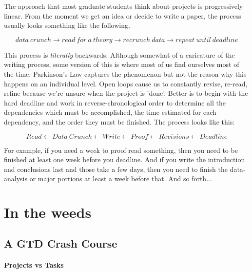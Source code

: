 \documentclass{tufte-handout}
\begin{document}
The approach that most graduate students think about projects is
progressively linear. From the moment we get an idea or decide to
write a paper, the process usually looks something like the following.

\[ data~ crunch \rightarrow read~ for~ a~ theory \rightarrow recrunch~
  data \rightarrow repeat~ until~ deadline \]

This process is \textit{literally} backwards. Although somewhat of a
caricature of the writing process, some version of this is where most
of us find ourselves most of the time. Parkinson's Law captures the
phenomenon but not the reason why this happens on an individual
level. Open loops cause us to constantly revise, re-read, refine
because we're unsure when the project is 'done'. Better is to begin
with the hard deadline and work in reverse-chronological order to
determine all the dependencies which must be accomplished, the time
estimated for each dependency, and the order they must be
finished. The process looks like this:

\[Read \leftarrow Data~ Crunch \leftarrow Write \leftarrow Proof  \leftarrow Revisions \leftarrow Deadline  \]

\noindent For example, if you need a week to proof read something, then
you need to be finished at least one week before you deadline. And if
you write the introduction and conclusions last and those take a few
days, then you need to finish the data-analysis or major portions at
least a week before that. And so forth...

\section{In the weeds}
\label{in-weeds}

\subsection{A GTD Crash Course}
\label{gtd-crash-course}

\paragraph{Projects vs Tasks}
\label{sec:proj-tasks}
\end{document}

